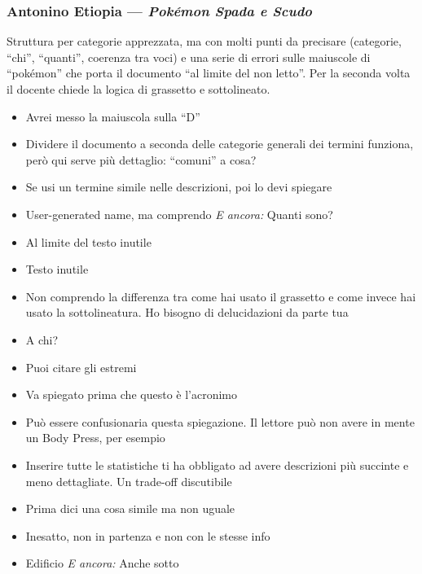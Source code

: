 \subsubsection{Antonino Etiopia --- \emph{Pokémon Spada e Scudo}}
Struttura per categorie apprezzata, ma con molti punti da precisare
(categorie, ``chi'', ``quanti'', coerenza tra voci) e una serie di errori sulle
maiuscole di ``pokémon'' che porta il documento ``al limite del non letto''.
Per la seconda volta il docente chiede la logica di grassetto e
sottolineato.
{\small
\begin{itemize}
  \item {} Avrei messo la maiuscola sulla ``D''
  \item {} Dividere il documento a seconda delle categorie generali dei termini funziona, però qui serve più dettaglio: ``comuni'' a cosa?
  \item {} Se usi un termine simile nelle descrizioni, poi lo devi spiegare
  \item {} User-generated name, ma comprendo \emph{E ancora:} Quanti sono?
  \item {} Al limite del testo inutile
  \item {} Testo inutile
  \item {} Non comprendo la differenza tra come hai usato il grassetto e come invece hai usato la sottolineatura. Ho bisogno di delucidazioni da parte tua
  \item {} A chi?
  \item {} Puoi citare gli estremi
  \item {} Va spiegato prima che questo è l'acronimo
  \item {} Può essere confusionaria questa spiegazione. Il lettore può non avere in mente un Body Press, per esempio
  \item {} Inserire tutte le statistiche ti ha obbligato ad avere descrizioni più succinte e meno dettagliate. Un trade-off discutibile
  \item {} Prima dici una cosa simile ma non uguale
  \item {} Inesatto, non in partenza e non con le stesse info
  \item {} Edificio \emph{E ancora:} Anche sotto

\end{itemize}}
